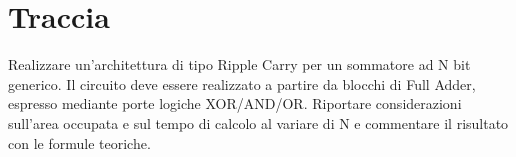 %

\section{Traccia}

Realizzare un'architettura di tipo Ripple Carry per un sommatore ad
N bit generico. Il circuito deve essere realizzato a partire da blocchi
di Full Adder, espresso mediante porte logiche XOR/AND/OR. Riportare
considerazioni sull'area occupata e sul tempo di calcolo al variare
di N e commentare il risultato con le formule teoriche.%

